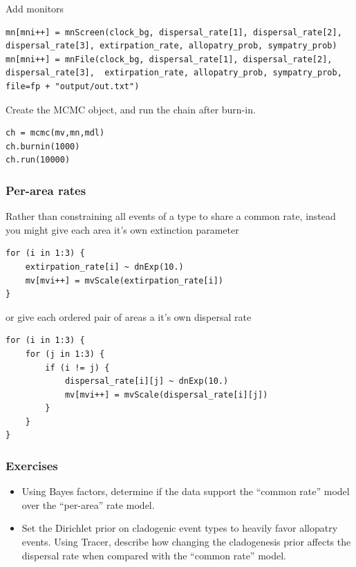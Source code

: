 Add monitors
\begin{snugshade}
\begin{lstlisting}
mn[mni++] = mnScreen(clock_bg, dispersal_rate[1], dispersal_rate[2], dispersal_rate[3], extirpation_rate, allopatry_prob, sympatry_prob)
mn[mni++] = mnFile(clock_bg, dispersal_rate[1], dispersal_rate[2], dispersal_rate[3],  extirpation_rate, allopatry_prob, sympatry_prob, file=fp + "output/out.txt")
\end{lstlisting}
\end{snugshade}

Create the MCMC object, and run the chain after burn-in.
\begin{snugshade}
\begin{lstlisting}
ch = mcmc(mv,mn,mdl)
ch.burnin(1000)
ch.run(10000)
\end{lstlisting}
\end{snugshade}

\subsubsection{Per-area rates}

Rather than constraining all events of a type to share a common rate, instead you might give each area it's own extinction parameter

\begin{snugshade}
\begin{lstlisting}
for (i in 1:3) {
    extirpation_rate[i] ~ dnExp(10.)
    mv[mvi++] = mvScale(extirpation_rate[i])
}
\end{lstlisting}
\end{snugshade}

or give each ordered pair of areas a it's own dispersal rate

\begin{snugshade}
\begin{lstlisting}
for (i in 1:3) {
    for (j in 1:3) {
        if (i != j) {
            dispersal_rate[i][j] ~ dnExp(10.)
            mv[mvi++] = mvScale(dispersal_rate[i][j])
        }
    }
}
\end{lstlisting}
\end{snugshade}

\subsubsection{Exercises}

\begin{itemize}
\item Using Bayes factors, determine if the data support the ``common rate'' model over the ``per-area'' rate model.
\item Set the Dirichlet prior on cladogenic event types to heavily favor allopatry events. Using Tracer, describe how changing the cladogenesis prior affects the dispersal rate when compared with the ``common rate'' model.
\end{itemize}


